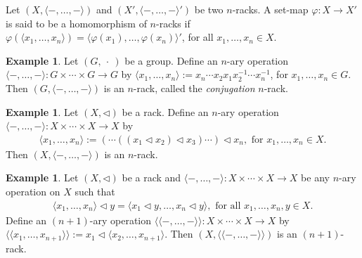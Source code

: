 \documentclass[a4paper,reqno,10pt]{amsart}
\theoremstyle{plain}
\theoremstyle{definition}
\newtheorem{exam}[thm]{Example}
\theoremstyle{remark}
\begin{document}
Let $(X, \langle -, \ldots, - \rangle)$ and $(X', \langle - , \ldots, - \rangle')$ be two $n$-racks. A set-map $\varphi : X \rightarrow X'$ is said to be a homomorphism of $n$-racks if $\varphi ( \langle x_1, \ldots, x_n \rangle ) = \langle \varphi (x_1), \ldots, \varphi (x_n) \rangle'$, for all $x_1, \ldots, x_n \in X.$

\begin{exam}
Let $(G, ~\! \! \cdot ~ \! \!)$ be a group. Define an $n$-ary operation $\langle - , \ldots, - \rangle : G \times \cdots \times G \rightarrow G$ by $\langle x_1, \ldots, x_n \rangle := x_n \cdots x_2 x_1 x_2^{-1} \cdots x_n^{-1}$, for $x_1, \ldots, x_n \in G$. Then $(G, \langle - , \ldots, - \rangle)$ is an $n$-rack, called the {\em conjugation} $n$-rack.
\end{exam}

\begin{exam}\label{exam-rack-to-nrack}
    Let $(X, \triangleleft)$ be a rack. Define an $n$-ary operation $\langle - , \ldots, - \rangle : X \times \cdots \times X \rightarrow X$ by
    \begin{align*}
        \langle x_1, \ldots, x_n \rangle := ( \cdots (( x_1 \triangleleft x_2) \triangleleft x_3 ) \cdots ) \triangleleft x_n, \text{ for } x_1, \ldots, x_n \in X.
    \end{align*}
    Then $(X, \langle - , \ldots, - \rangle )$ is an $n$-rack.
\end{exam}


\begin{exam}\label{rack-n-rack}
    Let $(X, \triangleleft)$ be a rack and $\langle -, \ldots, - \rangle : X \times \cdots \times X \rightarrow X$ be any $n$-ary operation on $X$ such that
    \begin{align*}
        \langle x_1, \ldots, x_n \rangle \triangleleft y = \langle x_1 \triangleleft y, \ldots, x_n \triangleleft y  \rangle, \text{ for all } x_1, \ldots, x_n, y \in X.
    \end{align*}
    Define an $(n+1)$-ary operation $ \langle \!  \langle  -, \ldots, - \rangle \! \rangle : X \times \cdots \times X \rightarrow X$ by $ \langle \!  \langle  x_1, \ldots, x_{n+1} \rangle \! \rangle := x_1 \triangleleft \langle x_2, \ldots, x_{n+1} \rangle$. Then $(X,  \langle \!  \langle  -, \ldots, - \rangle \! \rangle)$ is an $(n+1)$-rack.
\end{exam}
\end{document}

